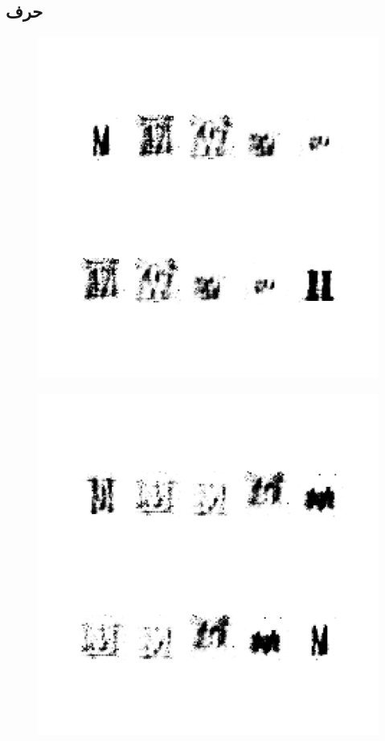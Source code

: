 \documentclass{article}
\begin{document}
\subsection{حرف }
\begin{figure}[H]
	\centerline{\includegraphics[width=\textwidth , height=\textheight ]{../results/CGAN_Adam/figs/letters/M/95.pdf}}
\end{figure}
\begin{figure}[H]
	\centerline{\includegraphics[width=\textwidth , height=\textheight ]{../results/CGAN_Adam/figs/letters/M/90.pdf}}
\end{figure}
\end{document}
